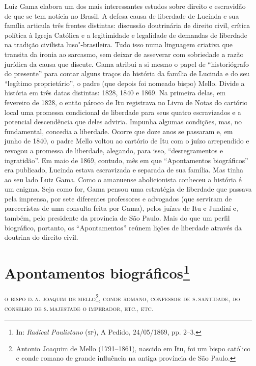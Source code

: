 {\small\noindent
Luiz Gama elabora um dos mais interessantes estudos sobre direito
e escravidão de que se tem notícia no Brasil. A defesa causa de
liberdade de Lucinda e sua família articula três frentes distintas:
discussão doutrinária de direito civil, crítica política à Igreja
Católica e a legitimidade e legalidade de demandas de liberdade na
tradição civilista luso"-brasileira. Tudo isso numa
linguagem criativa que transita da ironia ao sarcasmo, sem deixar de
asseverar com sobriedade a razão jurídica da causa que discute. Gama
atribui a si mesmo o papel de ``historiógrafo do presente'' para contar
alguns traços da história da família de Lucinda e do seu ``legítimo
proprietário'', o padre (que depois foi nomeado bispo) Mello. Divide a
história em três datas distintas: 1828, 1840 e 1869. Na primeira delas,
em fevereiro de 1828, o então pároco de Itu registrava no Livro de Notas
do cartório local uma promessa condicional de liberdade para seus quatro
escravizados e a potencial descendência que deles adviria. Impunha
algumas condições, mas, no fundamental, concedia a liberdade. Ocorre que
doze anos se passaram e, em junho de 1840, o padre Mello voltou ao
cartório de Itu com o juízo arrependido e revogou a promessa de
liberdade, alegando, para isso, ``desregramentos e ingratidão''. Em maio
de 1869, contudo, mês em que ``Apontamentos biográficos'' era publicado,
Lucinda estava escravizada e separada de sua família. Mas tinha ao seu
lado Luiz Gama. Como o amanuense abolicionista conheceu a história é um
enigma. Seja como for, Gama pensou uma estratégia de liberdade que
passava pela imprensa, por sete diferentes professores e advogados (que
serviram de pareceristas de uma consulta feita por Gama), pelos juízes
de Itu e Jundiaí e, também, pelo presidente da província de São Paulo.
Mais do que um perfil biográfico, portanto, os ``Apontamentos'' reúnem
lições de liberdade através da doutrina do direito civil. }

\chapter{Apontamentos biográficos\footnote[*]{In: \emph{Radical
  Paulistano} (\textsc{sp}), A Pedido, 24/05/1869, pp. 2--3.}}


\textsc{o bispo d.\,a. joaquim de mello}\footnote{Antonio Joaquim de Mello
  (1791--1861), nascido em Itu, foi um bispo católico e conde romano de
  grande influência na antiga província de São Paulo.}, \textsc{conde romano,
  confessor de s.\,santidade, do conselho de s.\,majestade o imperador,
  etc., etc.}

